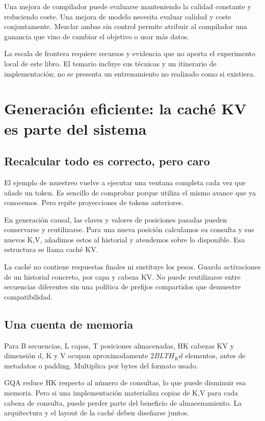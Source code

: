 \documentclass[12pt,a4paper,oneside]{report}
\begin{document}
Una mejora de compilador puede evaluarse manteniendo la calidad constante y reduciendo coste. Una mejora de modelo necesita evaluar calidad y coste conjuntamente. Mezclar ambas sin control permite atribuir al compilador una ganancia que vino de cambiar el objetivo o usar más datos.

La escala de frontera requiere recursos y evidencia que no aporta el experimento local de este libro. El temario incluye sus técnicas y un itinerario de implementación; no se presenta un entrenamiento no realizado como si existiera.

\chapter{Generación eficiente: la caché KV es parte del sistema}
\label{ch:kv-cache}
\section{Recalcular todo es correcto, pero caro}
El ejemplo de muestreo vuelve a ejecutar una ventana completa cada vez que añade un token. Es sencillo de comprobar porque utiliza el mismo avance que ya conocemos. Pero repite proyecciones de tokens anteriores.

En generación causal, las claves y valores de posiciones pasadas pueden conservarse y reutilizarse. Para una nueva posición calculamos su consulta y sus nuevos K,V, añadimos estos al historial y atendemos sobre lo disponible. Esa estructura se llama caché KV.

La caché no contiene respuestas finales ni sustituye los pesos. Guarda activaciones de un historial concreto, por capa y cabeza KV. No puede reutilizarse entre secuencias diferentes sin una política de prefijos compartidos que demuestre compatibilidad.

\section{Una cuenta de memoria}
Para B secuencias, L capas, T posiciones almacenadas, HK cabezas KV y dimensión d, K y V ocupan aproximadamente $2BLTH_Kd$ elementos, antes de metadatos o padding. Multiplica por bytes del formato usado.

GQA reduce HK respecto al número de consultas, lo que puede disminuir esa memoria. Pero si una implementación materializa copias de K,V para cada cabeza de consulta, puede perder parte del beneficio de almacenamiento. La arquitectura y el layout de la caché deben diseñarse juntos.
\end{document}
